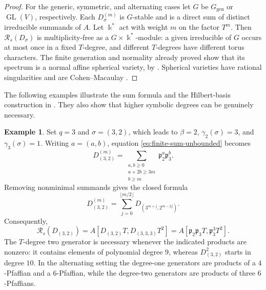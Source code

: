 \documentclass[11pt,reqno]{amsart}
\numberwithin{equation}{subsection}
\theoremstyle{definition}
\newtheorem{example}[theorem]{Example}
\theoremstyle{remark}
\DeclareMathOperator{\GL}{GL}
\newcommand{\kfield}{\Bbbk}
\newcommand{\cR}{\mathcal R}
\newcommand{\fp}{\mathfrak p}
\begin{document}
\begin{proof}
For the generic, symmetric, and alternating cases let $G$ be $G_{\mathrm{gen}}$ or $\GL(V)$,
respectively. Each $D_\sigma^{(m)}$ is $G$-stable and is a direct sum of distinct irreducible summands of $A$. Let $\kfield^*$ act with weight $m$
on the factor $T^m$. Then $\cR_s(D_\sigma)$ is multiplicity-free as a $G\times\kfield^*$-module: a given irreducible of $G$ occurs at most once
in a fixed $T$-degree, and different $T$-degrees have different torus characters. The finite generation and normality already proved show
that its spectrum is a normal affine spherical variety, by \cite[Theorem~2.1.2]{Perrin}. Spherical varieties  have rational singularities and are Cohen--Macaulay
\cite[Corollary~2.3.4]{Perrin}. 
\end{proof}

The following examples illustrate the sum formula and the Hilbert-basis
construction in .  They also
show that higher symbolic degrees can be genuinely necessary.

\begin{example}\label{ex:32}
Set $q=3$ and $\sigma=(3,2)$, which leads to
 $\beta=2$, $\gamma_2(\sigma)=3$, and
$\gamma_3(\sigma)=1$.  Writing $a=(a,b)$, equation \eqref{eq:finite-sum-unbounded} becomes
\[
 D_{(3,2)}^{(m)}
 =\sum_{\substack{a,b\ge0\\a+2b\ge3m\\b\ge m}}
   \fp_2^a\fp_3^b.
\]
Removing nonminimal summands gives the closed formula
\[
 D_{(3,2)}^{(m)}
 =\sum_{j=0}^{\lfloor m/2\rfloor}
 D_{(3^{m+j},2^{m-2j})}.
\]
Consequently,
\begin{equation}\label{eq:32-rees}
 \cR_s(D_{(3,2)})
 =A[D_{(3,2)}T,D_{(3,3,3)}T^2]
 =A[\fp_2\fp_3T,\fp_3^3T^2].
\end{equation}
The $T$-degree two generator is necessary whenever the indicated products are
nonzero: it contains elements of polynomial degree $9$, whereas
$D_{(3,2)}^2$ starts in degree $10$.  In the alternating setting the
degree-one generators are products of a $4$-Pfaffian and a
$6$-Pfaffian, while the degree-two generators are products of three
$6$-Pfaffians.
\end{example}
\end{document}
